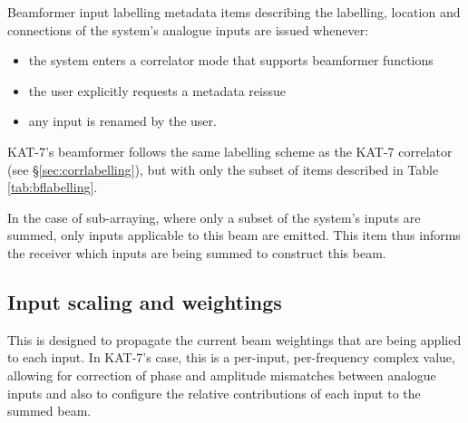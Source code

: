 \documentclass[11pt,english,twoside]{article}
\begin{document}
Beamformer input labelling metadata items describing the labelling, location and connections of the system's analogue inputs are issued whenever:

\begin{itemize}
\item the system enters a correlator mode that supports beamformer functions
\item the user explicitly requests a metadata reissue
\item any input is renamed by the user.
\end{itemize}

KAT-7's beamformer follows the same labelling scheme as the KAT-7 correlator (see \S\ref{sec:corrlabelling}), but with only the subset of items
described in Table \ref{tab:bflabelling}. 

In the case of sub-arraying, where only a subset of the system's inputs are summed, only inputs applicable to this beam are emitted. This item
thus informs the receiver which inputs are being summed to construct this beam. 


\subsection{Input scaling and weightings}
This is designed to propagate the current beam weightings that are being applied to each input. In KAT-7's case, this is a per-input,
per-frequency complex value, allowing for correction of phase and amplitude mismatches between analogue inputs and also to configure the
relative contributions of each input to the summed beam. 
\end{document}
